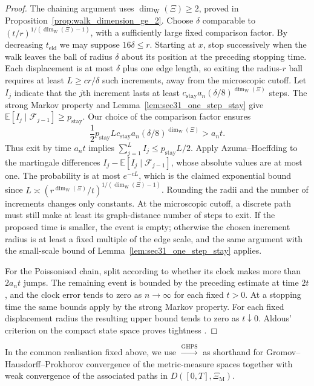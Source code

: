 \documentclass{article}
\theoremstyle{plain}
\theoremstyle{definition}
\newcommand{\dimwalk}{\dim_\mathrm{W}}
\begin{document}
\begingroup\color{red}
\begin{proof}
The chaining argument uses $\dimwalk(\Xi)\ge2$, proved in
Proposition~\ref{prop:walk_dimension_ge_2}.
Choose $\delta$ comparable to
$(t/r)^{1/(\dimwalk(\Xi)-1)}$, with a sufficiently large fixed
comparison factor. By decreasing $t_{\mathrm{eld}}$ we may suppose
$16\delta\le r$. Starting at $x$, stop successively when the walk
leaves the ball of radius $\delta$ about its position at the preceding
stopping time. Each displacement is at most $\delta$ plus one edge
length, so exiting the radius-$r$ ball requires at least
$L\ge c r/\delta$ such increments, away from the microscopic cutoff.
Let $I_j$ indicate that the $j$th increment lasts at least
$c_{\mathrm{stay}}a_n(\delta/8)^{\dimwalk(\Xi)}$ steps.
The strong Markov property and Lemma~\ref{lem:sec31_one_step_stay}
give $\mathbb E[I_j\mid\mathcal F_{j-1}]\ge p_{\mathrm{stay}}$.
Our choice of the comparison factor ensures
\[
\frac12 p_{\mathrm{stay}}L
c_{\mathrm{stay}}a_n(\delta/8)^{\dimwalk(\Xi)}>a_nt.
\]
Thus exit by time $a_nt$ implies
$\sum_{j=1}^L I_j\le p_{\mathrm{stay}}L/2$.
Apply Azuma--Hoeffding to the martingale differences
$I_j-\mathbb E[I_j\mid\mathcal F_{j-1}]$, whose absolute values
are at most one. The probability is at most $e^{-cL}$, which is the
claimed exponential bound since
$L\asymp(r^{\dimwalk(\Xi)}/t)^{1/(\dimwalk(\Xi)-1)}$.
Rounding the radii and the number of increments changes only constants.
At the microscopic cutoff, a discrete path must still make at least
its graph-distance number of steps to exit. If the proposed time is
smaller, the event is empty; otherwise the chosen increment radius
is at least a fixed multiple of the edge scale, and the same argument
with the small-scale bound of Lemma~\ref{lem:sec31_one_step_stay} applies.

For the Poissonised chain, split according to whether its clock makes
more than $2a_nt$ jumps. The remaining event is bounded by the preceding
estimate at time $2t$, and the clock error tends to zero as $n\to\infty$
for each fixed $t>0$. At a stopping time the same bounds apply by the
strong Markov property. For each fixed displacement radius the resulting
upper bound tends to zero as $t\downarrow0$.
Aldous' criterion on the compact state space proves tightness
\cite{azuma1967weighted,aldous1978stopping,billingsley1999convergence}.
\end{proof}
\endgroup{}




In the common realisation fixed above, we use
$\overset{\mathrm{GHPS}}{\longrightarrow}$
as shorthand for Gromov--Hausdorff--Prokhorov convergence of the metric-measure spaces together with weak convergence of the associated paths in $D([0,T],\Xi_{\mathrm M})$.
\end{document}

